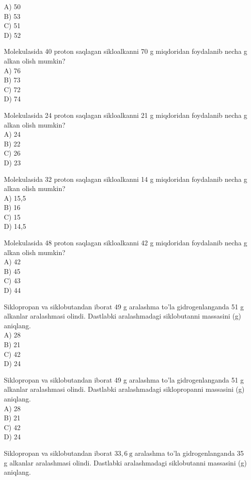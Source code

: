 A) 50\\
B) 53\\
C) 51\\
D) 52
  \item Molekulasida 40 proton saqlagan sikloalkanni 70 g miqdoridan foydalanib necha g alkan olish mumkin?\\
A) 76\\
B) 73\\
C) 72\\
D) 74
  \item Molekulasida 24 proton saqlagan sikloalkanni 21 g miqdoridan foydalanib necha g alkan olish mumkin?\\
A) 24\\
B) 22\\
C) 26\\
D) 23
  \item Molekulasida 32 proton saqlagan sikloalkanni 14 g miqdoridan foydalanib necha g alkan olish mumkin?\\
A) 15,5\\
B) 16\\
C) 15\\
D) 14,5
  \item Molekulasida 48 proton saqlagan sikloalkanni 42 g miqdoridan foydalanib necha g alkan olish mumkin?\\
A) 42\\
B) 45\\
C) 43\\
D) 44
  \item Siklopropan va siklobutandan iborat 49 g aralashma to'la gidrogenlanganda 51 g alkanlar aralashmasi olindi. Dastlabki aralashmadagi siklobutanni massasini (g) aniqlang.\\
A) 28\\
B) 21\\
C) 42\\
D) 24
  \item Siklopropan va siklobutandan iborat 49 g aralashma to'la gidrogenlanganda 51 g alkanlar aralashmasi olindi. Dastlabki aralashmadagi siklopropanni massasini (g) aniqlang.\\
A) 28\\
B) 21\\
C) 42\\
D) 24
  \item Siklopropan va siklobutandan iborat $33,6 \mathrm{~g}$ aralashma to'la gidrogenlanganda 35 g alkanlar aralashmasi olindi. Dastlabki aralashmadagi siklobutanni massasini (g) aniqlang.\\
